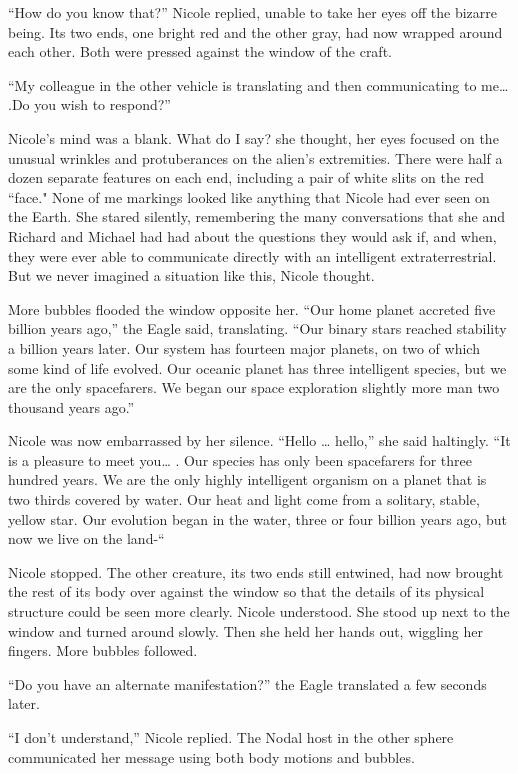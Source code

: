 \documentclass[]{article}
\begin{document}
{“How do you know that?” Nicole replied, unable to take her eyes off the bizarre being.  Its two ends, one bright red and the other gray, had now wrapped around each other.  Both were pressed against the window of the craft.

“My colleague in the other vehicle is translating and then communicating to me… .Do you wish to respond?”

Nicole’s mind was a blank.  What do I say? she thought, her eyes focused on the unusual wrinkles and protuberances on the alien’s extremities.  There were half a dozen separate features on each end, including a pair of white slits on the red “face."  None of me markings looked like anything that Nicole had ever seen on the Earth.  She stared silently, remembering the many conversations that she and Richard and Michael had had about the questions they would ask if, and when, they were ever able to communicate directly with an intelligent extraterrestrial.  But we never imagined a situation like this, Nicole thought.

More bubbles flooded the window opposite her.  “Our home planet accreted five billion years ago,” the Eagle said, translating.  “Our binary stars reached stability a billion years later.  Our system has fourteen major planets, on two of which some kind of life evolved.  Our oceanic planet has three intelligent species, but we are the only spacefarers.  We began our space exploration slightly more man two thousand years ago.”

Nicole was now embarrassed by her silence.  “Hello … hello,” she said haltingly.  “It is a pleasure to meet you… .  Our species has only been spacefarers for three hundred years.  We are the only highly intelligent organism on a planet that is two thirds covered by water.  Our heat and light come from a solitary, stable, yellow star.  Our evolution began in the water, three or four billion years ago, but now we live on the land-“

Nicole stopped.  The other creature, its two ends still entwined, had now brought the rest of its body over against the window so that the details of its physical structure could be seen more clearly.  Nicole understood.  She stood up next to the window and turned around slowly.  Then she held her hands out, wiggling her fingers.  More bubbles followed.

“Do you have an alternate manifestation?” the Eagle translated a few seconds later.

“I don’t understand,” Nicole replied.  The Nodal host in the other sphere communicated her message using both body motions and bubbles.

}
\end{document}
